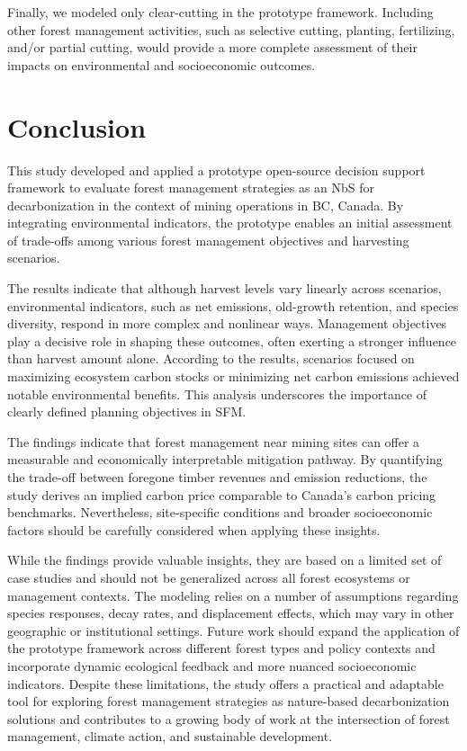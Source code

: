 \documentclass[preprint,12pt]{elsarticle}
\begin{document}
Finally, we modeled only clear-cutting in the prototype framework. Including other forest management activities, such as selective cutting, planting, fertilizing, and/or partial cutting, would provide a more complete assessment of their impacts on environmental and socioeconomic outcomes.

\section{Conclusion}
\label{sec: conclusion}
This study developed and applied a prototype open-source decision support framework to evaluate forest management strategies as an NbS for decarbonization in the context of mining operations in BC, Canada. By integrating environmental indicators, the prototype enables an initial assessment of trade-offs among various forest management objectives and harvesting scenarios.

The results indicate that although harvest levels vary linearly across scenarios, environmental indicators, such as net emissions, old-growth retention, and species diversity, respond in more complex and nonlinear ways. Management objectives play a decisive role in shaping these outcomes, often exerting a stronger influence than harvest amount alone. According to the results, scenarios focused on maximizing ecosystem carbon stocks or minimizing net carbon emissions achieved notable environmental benefits. This analysis underscores the importance of clearly defined planning objectives in SFM. 

The findings indicate that forest management near mining sites can offer a measurable and economically interpretable mitigation pathway. By quantifying the trade-off between foregone timber revenues and emission reductions, the study derives an implied carbon price comparable to Canada’s carbon pricing benchmarks. Nevertheless, site-specific conditions and broader socioeconomic factors should be carefully considered when applying these insights.

While the findings provide valuable insights, they are based on a limited set of case studies and should not be generalized across all forest ecosystems or management contexts. The modeling relies on a number of assumptions regarding species responses, decay rates, and displacement effects, which may vary in other geographic or institutional settings. Future work should expand the application of the prototype framework across different forest types and policy contexts and incorporate dynamic ecological feedback and more nuanced socioeconomic indicators. Despite these limitations, the study offers a practical and adaptable tool for exploring forest management strategies as nature-based decarbonization solutions and contributes to a growing body of work at the intersection of forest management, climate action, and sustainable development.
\end{document}
